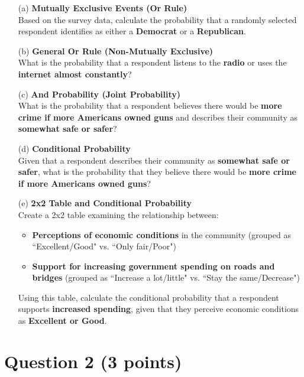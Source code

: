 \documentclass[11pt]{article}
\begin{document}
\begin{itemize}
    \item[(a)] \textbf{Mutually Exclusive Events (Or Rule)} \\
    Based on the survey data, calculate the probability that a randomly selected respondent identifies as either a \textbf{Democrat} or a \textbf{Republican}.

    \item[(b)] \textbf{General Or Rule (Non-Mutually Exclusive)} \\
    What is the probability that a respondent listens to the \textbf{radio} or uses the \textbf{internet almost constantly}?

    \item[(c)] \textbf{And Probability (Joint Probability)} \\
    What is the probability that a respondent believes there would be \textbf{more crime if more Americans owned guns} and describes their community as \textbf{somewhat safe or safer}?

    \item[(d)] \textbf{Conditional Probability} \\
    Given that a respondent describes their community as \textbf{somewhat safe or safer}, what is the probability that they believe there would be \textbf{more crime if more Americans owned guns}?

    \item[(e)] \textbf{2x2 Table and Conditional Probability} \\
    Create a 2x2 table examining the relationship between:
    \begin{itemize}
        \item \textbf{Perceptions of economic conditions} in the community (grouped as ``Excellent/Good" vs. ``Only fair/Poor")
        \item \textbf{Support for increasing government spending on roads and bridges} (grouped as ``Increase a lot/little" vs. ``Stay the same/Decrease")
    \end{itemize}
    Using this table, calculate the conditional probability that a respondent supports \textbf{increased spending}, given that they perceive economic conditions as \textbf{Excellent or Good}.
\end{itemize}


\newpage
\section*{Question 2 (3 points)}
\end{document}
